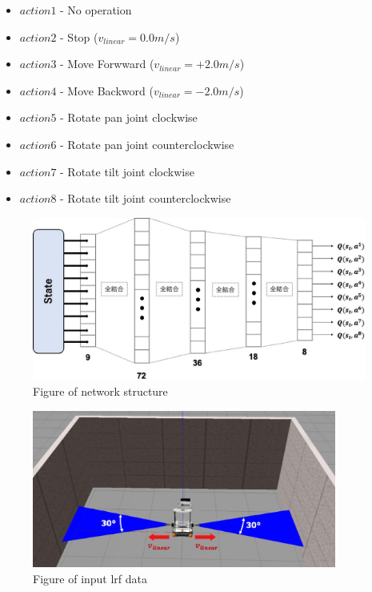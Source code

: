 \documentclass[12pt]{sonota/aislab}
\begin{document}
\begin{itemize}
    \item $action1$ - No operation 
    \item $action2$ - Stop ($v_{linear} = 0.0 m/s$)
    \item $action3$ - Move Forwward ($v_{linear} = +2.0 m/s$)
    \item $action4$ - Move Backword ($v_{linear} = -2.0 m/s$)
    \item $action5$ - Rotate pan joint clockwise
    \item $action6$ - Rotate pan joint counterclockwise
    \item $action7$ - Rotate tilt joint clockwise 
    \item $action8$ - Rotate tilt joint counterclockwise
\end{itemize}

\begin{figure}[t]
\begin{center}
\includegraphics[clip, width=11cm]{figs/network_structure.eps}
\caption{Figure of network structure}
\label{structure}
\end{center}
\end{figure}

\begin{figure}[t]
\begin{center}
\includegraphics[clip, width=10cm]{figs/input_lrf_data.eps}
\caption{Figure of input lrf data}
\label{input_lrf}
\end{center}
\end{figure}
\end{document}
